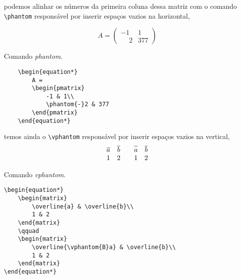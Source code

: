 \noindent podemos alinhar os n\'{u}meros da primeira coluna dessa matriz com o comando \verb|\phantom| respons\'{a}vel por inserir espa\c cos vazios na horizontal,

\begin{equation*}
    A = 
    \begin{pmatrix}
        -1 & 1\\
        \phantom{-}2 & 377
    \end{pmatrix}     
\end{equation*}

\begin{programcode}{Comando \emph{phantom}.}
\begin{verbatim}
    \begin{equation*}
        A = 
        \begin{pmatrix}
            -1 & 1\\
            \phantom{-}2 & 377
        \end{pmatrix}     
    \end{equation*}
\end{verbatim}
\end{programcode}

\noindent temos ainda o \verb|\vphantom| respons\'{a}vel por inserir espa\c cos vazios na vertical,
\begin{equation*} 
    \begin{matrix}
        \overline{a} & \overline{b}\\
        1 & 2
    \end{matrix}  
    \qquad
    \begin{matrix}
        \overline{\vphantom{B}a} & \overline{b}\\
        1 & 2
    \end{matrix}    
\end{equation*} 

\begin{programcode}{Comando \emph{vphantom}.}
\begin{verbatim}
\begin{equation*} 
    \begin{matrix}
        \overline{a} & \overline{b}\\
        1 & 2
    \end{matrix}  
    \qquad
    \begin{matrix}
        \overline{\vphantom{B}a} & \overline{b}\\
        1 & 2
    \end{matrix}    
\end{equation*}
\end{verbatim}
\end{programcode}

